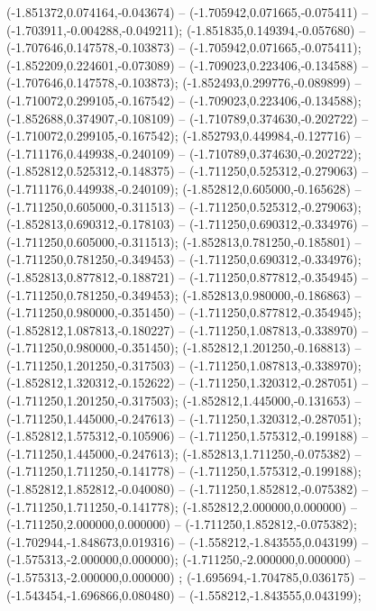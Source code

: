  (-1.851372,0.074164,-0.043674) -- (-1.705942,0.071665,-0.075411) -- (-1.703911,-0.004288,-0.049211);
 (-1.851835,0.149394,-0.057680) -- (-1.707646,0.147578,-0.103873) -- (-1.705942,0.071665,-0.075411);
 (-1.852209,0.224601,-0.073089) -- (-1.709023,0.223406,-0.134588) -- (-1.707646,0.147578,-0.103873);
 (-1.852493,0.299776,-0.089899) -- (-1.710072,0.299105,-0.167542) -- (-1.709023,0.223406,-0.134588);
 (-1.852688,0.374907,-0.108109) -- (-1.710789,0.374630,-0.202722) -- (-1.710072,0.299105,-0.167542);
 (-1.852793,0.449984,-0.127716) -- (-1.711176,0.449938,-0.240109) -- (-1.710789,0.374630,-0.202722);
 (-1.852812,0.525312,-0.148375) -- (-1.711250,0.525312,-0.279063) -- (-1.711176,0.449938,-0.240109);
 (-1.852812,0.605000,-0.165628) -- (-1.711250,0.605000,-0.311513) -- (-1.711250,0.525312,-0.279063);
 (-1.852813,0.690312,-0.178103) -- (-1.711250,0.690312,-0.334976) -- (-1.711250,0.605000,-0.311513);
 (-1.852813,0.781250,-0.185801) -- (-1.711250,0.781250,-0.349453) -- (-1.711250,0.690312,-0.334976);
 (-1.852813,0.877812,-0.188721) -- (-1.711250,0.877812,-0.354945) -- (-1.711250,0.781250,-0.349453);
 (-1.852813,0.980000,-0.186863) -- (-1.711250,0.980000,-0.351450) -- (-1.711250,0.877812,-0.354945);
 (-1.852812,1.087813,-0.180227) -- (-1.711250,1.087813,-0.338970) -- (-1.711250,0.980000,-0.351450);
 (-1.852812,1.201250,-0.168813) -- (-1.711250,1.201250,-0.317503) -- (-1.711250,1.087813,-0.338970);
 (-1.852812,1.320312,-0.152622) -- (-1.711250,1.320312,-0.287051) -- (-1.711250,1.201250,-0.317503);
 (-1.852812,1.445000,-0.131653) -- (-1.711250,1.445000,-0.247613) -- (-1.711250,1.320312,-0.287051);
 (-1.852812,1.575312,-0.105906) -- (-1.711250,1.575312,-0.199188) -- (-1.711250,1.445000,-0.247613);
 (-1.852813,1.711250,-0.075382) -- (-1.711250,1.711250,-0.141778) -- (-1.711250,1.575312,-0.199188);
 (-1.852812,1.852812,-0.040080) -- (-1.711250,1.852812,-0.075382) -- (-1.711250,1.711250,-0.141778);
 (-1.852812,2.000000,0.000000) -- (-1.711250,2.000000,0.000000) -- (-1.711250,1.852812,-0.075382);
 (-1.702944,-1.848673,0.019316) -- (-1.558212,-1.843555,0.043199) -- (-1.575313,-2.000000,0.000000);
 (-1.711250,-2.000000,0.000000) -- (-1.575313,-2.000000,0.000000) ;
 (-1.695694,-1.704785,0.036175) -- (-1.543454,-1.696866,0.080480) -- (-1.558212,-1.843555,0.043199);
